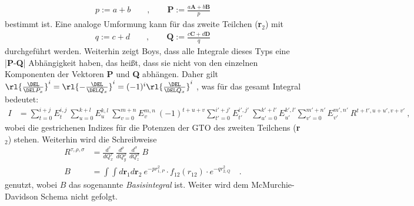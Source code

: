 %
\begin{align}\label{eq:neuesZentrum_P}
p:=a+b \qquad, \qquad
\textbf{P}:=\frac{a\textbf{A}+b\textbf{B}}{p}
\end{align}
%
bestimmt ist. Eine analoge Umformung kann für das 
zweite Teilchen (\textbf{r}$_2$) mit
%
\begin{align}\label{eq:Q}
q:=c+d \qquad, \qquad
\textbf{Q}:=\frac{c\textbf{C}+d\textbf{D}}{q}
\end{align}
%
durchgeführt werden. Weiterhin zeigt Boys, dass alle Integrale dieses Typs eine 
|\textbf{P}-\textbf{Q}| Abhängigkeit haben, das heißt, dass sie nicht von den 
einzelnen Komponenten der Vektoren \textbf{P} und \textbf{Q} abhängen. Daher  
gilt 
%
$\rl{\frac{\DEL}{\DEL P_x}}^i = \rl{-\frac{\DEL}{\DEL 
Q_x}}^i=(-1)^i \rl{\frac{\DEL}{\DEL Q_x}}^i$
%
, was für das gesamt Integral bedeutet:
%
\begin{align}\label{eq:E:Koef}
I &= %
\sum_{t=0}^{i+j}E^{i,j}_t\ \sum_{u=0}^{k+l}E^{k,l}_u\ 
\sum_{v=0}^{m+n}E^{m,n}_v\ (-1)^{t+u+v} \sum_{t'=0}^{i'+j'}E^{i',j'}_{t'}\ 
\sum_{u'=0}^{k'+l'}E^{k',l'}_{u'} \sum_{v'=0}^{m'+n'}E^{m',n'}_{v'}\ 
R^{t+t',u+u',v+v'}\ ,
\end{align}
%
wobei die gestrichenen Indizes für die Potenzen der GTO des 
zweiten Teilchens 
(\textbf{r}$_2$) stehen. Weiterhin wird die Schreibweise
% 
\begin{align}\label{eq:McM-D:kartesieAbleitungen}
R^{\tau,\rho,\sigma}&=\frac{d^\tau}{dQ^\tau_x}\ 
\frac{d^\rho}{dQ^\rho_y}\ \frac{d^\sigma}{dQ^\sigma_z}\ 
B\\\label{eq:basisint1}
B&= \int \int d\textbf{r}_1 d\textbf{r}_2 \ e^{-pr_{1,P}^2} \cdot 
f_{12}(r_{12}) \cdot e^{-qr_{2,Q}^2} \quad.
\end{align}
%
genutzt, wobei $B$ das sogenannte \textit{Basisintegral}  ist. Weiter wird dem 
McMurchie-Davidson Schema nicht gefolgt. 
%
%
%
